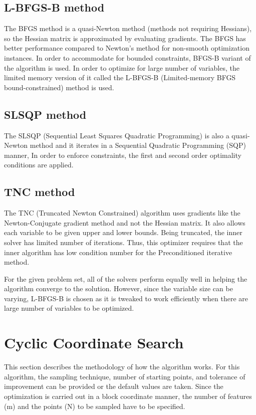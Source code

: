 \subsection{L-BFGS-B method}
The BFGS method is a quasi-Newton method (methods not requiring Hessians), so the Hessian matrix is approximated by evaluating gradients. The BFGS has better performance compared to Newton’s method for non-smooth optimization instances. In order to accommodate for bounded constraints, BFGS-B variant of the algorithm is used. In order to optimize for large number of variables, the limited memory version of it called the L-BFGS-B (Limited-memory BFGS bound-constrained) method is used. 

\subsection{SLSQP method}
The SLSQP (Sequential Least Squares Quadratic Programming) is also a quasi-Newton method and it iterates in a Sequential Quadratic Programming (SQP) manner, In order to enforce constraints, the first and second order optimality conditions are applied.

\subsection{TNC method}
The TNC (Truncated Newton Constrained) algorithm uses gradients \cite{Nash1984} like the Newton-Conjugate gradient method and not the Hessian matrix. It also allows each variable to be given upper and lower bounds.  
Being truncated, the inner solver has limited number of iterations. Thus, this optimizer requires that the inner algorithm has low condition number for the Preconditioned iterative method.

\bigskip
\noindent
For the given problem set, all of the solvers perform equally well in helping the algorithm converge to the solution. However, since the variable size can be varying, L-BFGS-B is chosen  as it is tweaked to work efficiently when there are large  number of variables to be optimized.

\section{Cyclic Coordinate Search}

This section describes the methodology of how the algorithm works. For this algorithm, the sampling technique, number of starting points, and tolerance of improvement can be provided or the default values are taken. Since the optimization is carried out in a block coordinate manner, the number of features (m) and the points (N) to be sampled have to be specified.  

